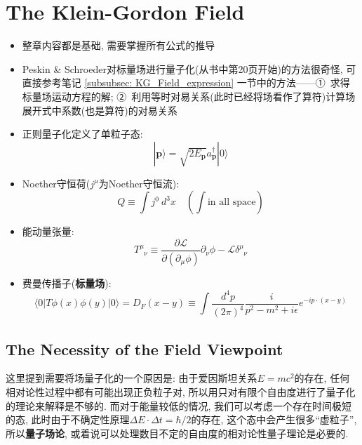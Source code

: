 \chapter{The Klein-Gordon Field}

\begin{itemize}
  \item 整章内容都是基础, 需要掌握所有公式的推导
  \item Peskin \& Schroeder对标量场进行量子化(从书中第20页开始)的方法很奇怪, 可直接参考笔记 \ref{subsubsec: KG_Field_expression} 一节中的方法——①\ 求得标量场运动方程的解; ②\ 利用等时对易关系(此时已经将场看作了算符)计算场展开式中系数(也是算符)的对易关系
  \item 正则量子化定义了单粒子态:
        \begin{equation*}
          |\mathbf{p}\rangle = \sqrt{2E_{\mathbf{p}}}a^{\dagger}_{\mathbf{p}}|0\rangle
        \end{equation*}
  \item Noether守恒荷($j^\mu$为Noether守恒流):
        \begin{equation*}
          Q \equiv \int j^0\ d^3x \quad (\int \text{in\ all\ space})
        \end{equation*}
  \item 能动量张量:
        \begin{equation*}
          T^{\mu}_{\phantom{\mu}\nu}\equiv \frac{\partial \mathcal{L}}{\partial (\partial_{\mu} \phi)} \partial_{\nu} \phi - \mathcal{L}\delta^{\mu}_{\phantom{\mu}\nu}
        \end{equation*}
  \item 费曼传播子(\textbf{标量场}):
        \begin{equation*}
          \langle 0|T\phi(x)\phi(y)|0 \rangle = D_F(x-y)\equiv \int \frac{d^4 p}{(2\pi)^4} \frac{i}{p^2 - m^2 +i\epsilon} e^{-ip\cdot (x-y)}
        \end{equation*}
\end{itemize}
\pagestyle{general}

\section{The Necessity of the Field Viewpoint}

这里提到需要将场量子化的一个原因是: 由于爱因斯坦关系$E = mc^2$的存在, 任何相对论性过程中都有可能出现正负粒子对, 所以用只对有限个自由度进行了量子化的理论来解释是不够的.
而对于能量较低的情况, 我们可以考虑一个存在时间极短的态, 此时由于不确定性原理$\Delta E \cdot \Delta t = \hbar /2$的存在, 这个态中会产生很多“虚粒子”, 所以\textbf{量子场论}, 或着说可以处理数目不定的自由度的相对论性量子理论是必要的.

